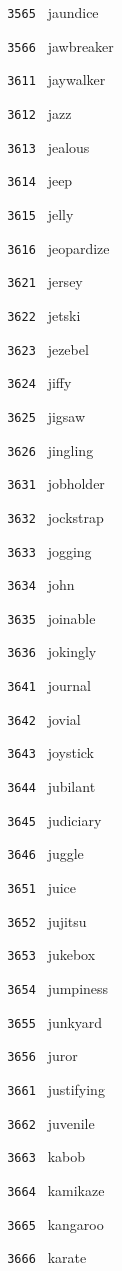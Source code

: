 \documentclass[11pt]{article}
\begin{document}
\begin{multicols}{6}
\noindent \texttt{ 3565 } jaundice  \par
\noindent \texttt{ 3566 } jawbreaker  \par
\noindent \texttt{ 3611 } jaywalker  \par
\noindent \texttt{ 3612 } jazz  \par
\noindent \texttt{ 3613 } jealous  \par
\noindent \texttt{ 3614 } jeep  \par
\noindent \texttt{ 3615 } jelly  \par
\noindent \texttt{ 3616 } jeopardize  \par
\vspace{3mm}
\noindent \texttt{ 3621 } jersey  \par
\noindent \texttt{ 3622 } jetski  \par
\noindent \texttt{ 3623 } jezebel  \par
\noindent \texttt{ 3624 } jiffy  \par
\noindent \texttt{ 3625 } jigsaw  \par
\noindent \texttt{ 3626 } jingling  \par
\vspace{3mm}
\noindent \texttt{ 3631 } jobholder  \par
\noindent \texttt{ 3632 } jockstrap  \par
\noindent \texttt{ 3633 } jogging  \par
\noindent \texttt{ 3634 } john  \par
\noindent \texttt{ 3635 } joinable  \par
\noindent \texttt{ 3636 } jokingly  \par
\vspace{3mm}
\noindent \texttt{ 3641 } journal  \par
\noindent \texttt{ 3642 } jovial  \par
\noindent \texttt{ 3643 } joystick  \par
\noindent \texttt{ 3644 } jubilant  \par
\noindent \texttt{ 3645 } judiciary  \par
\noindent \texttt{ 3646 } juggle  \par
\vspace{3mm}
\noindent \texttt{ 3651 } juice  \par
\noindent \texttt{ 3652 } jujitsu  \par
\noindent \texttt{ 3653 } jukebox  \par
\noindent \texttt{ 3654 } jumpiness  \par
\noindent \texttt{ 3655 } junkyard  \par
\noindent \texttt{ 3656 } juror  \par
\vspace{3mm}
\noindent \texttt{ 3661 } justifying  \par
\noindent \texttt{ 3662 } juvenile  \par
\noindent \texttt{ 3663 } kabob  \par
\noindent \texttt{ 3664 } kamikaze  \par
\noindent \texttt{ 3665 } kangaroo  \par
\noindent \texttt{ 3666 } karate  \par
\end{multicols}
\end{document}
